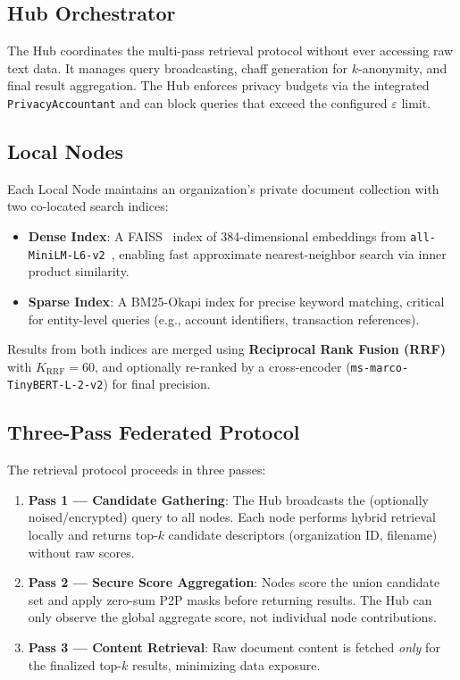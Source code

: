 \documentclass[conference]{IEEEtran}
\begin{document}
\subsection{Hub Orchestrator}

The Hub coordinates the multi-pass retrieval protocol without ever accessing raw text data. It manages query broadcasting, chaff generation for $k$-anonymity, and final result aggregation. The Hub enforces privacy budgets via the integrated \texttt{PrivacyAccountant} and can block queries that exceed the configured $\varepsilon$ limit.

\subsection{Local Nodes}

Each Local Node maintains an organization's private document collection with two co-located search indices:

\begin{itemize}
    \item \textbf{Dense Index}: A FAISS~\cite{johnson2019billion} index of 384-dimensional embeddings from \texttt{all-MiniLM-L6-v2}~\cite{reimers2019sentence}, enabling fast approximate nearest-neighbor search via inner product similarity.
    \item \textbf{Sparse Index}: A BM25-Okapi index for precise keyword matching, critical for entity-level queries (e.g., account identifiers, transaction references).
\end{itemize}

Results from both indices are merged using \textbf{Reciprocal Rank Fusion (RRF)}~\cite{cormack2009reciprocal} with $K_{\text{RRF}}=60$, and optionally re-ranked by a cross-encoder (\texttt{ms-marco-TinyBERT-L-2-v2}) for final precision.

\subsection{Three-Pass Federated Protocol}

The retrieval protocol proceeds in three passes:

\begin{enumerate}
    \item \textbf{Pass 1 --- Candidate Gathering}: The Hub broadcasts the (optionally noised/encrypted) query to all nodes. Each node performs hybrid retrieval locally and returns top-$k$ candidate descriptors (organization ID, filename) without raw scores.
    
    \item \textbf{Pass 2 --- Secure Score Aggregation}: Nodes score the union candidate set and apply zero-sum P2P masks before returning results. The Hub can only observe the global aggregate score, not individual node contributions.
    
    \item \textbf{Pass 3 --- Content Retrieval}: Raw document content is fetched \textit{only} for the finalized top-$k$ results, minimizing data exposure.
\end{enumerate}
\end{document}
